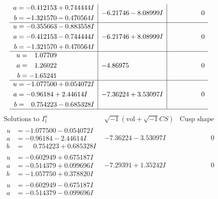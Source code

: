 \documentclass[1p]{elsarticle_modified}
\theoremstyle{definition}
\newcommand{\I}{\sqrt{-1}}
\begin{document}
$$\begin{array}{c|c|c}
\begin{aligned}
a &= -0.412153 + 0.744444 I \\
b &= -1.321570 - 0.470564 I\end{aligned}
 & -6.21746 - 8.08999 I & \phantom{-0.000000 } 0 \\ \hline\begin{aligned}
u &= -0.355663 - 0.883558 I \\
a &= -0.412153 - 0.744444 I \\
b &= -1.321570 + 0.470564 I\end{aligned}
 & -6.21746 + 8.08999 I & \phantom{-0.000000 } 0 \\ \hline\begin{aligned}
u &= \phantom{-}1.07709\phantom{ +0.000000I} \\
a &= \phantom{-}1.26022\phantom{ +0.000000I} \\
b &= -1.65241\phantom{ +0.000000I}\end{aligned}
 & -4.86975\phantom{ +0.000000I} & \phantom{-0.000000 } 0 \\ \hline\begin{aligned}
u &= -1.077500 + 0.054072 I \\
a &= -0.96184 + 2.44614 I \\
b &= \phantom{-}0.754223 - 0.685328 I\end{aligned}
 & -7.36224 + 3.53097 I & \phantom{-0.000000 } 0\\
 \hline 
 \end{array}$$\newpage$$\begin{array}{c|c|c}  
\text{Solutions to }I^u_{1}& \I (\text{vol} + \sqrt{-1}CS) & \text{Cusp shape}\\
 \hline 
\begin{aligned}
u &= -1.077500 - 0.054072 I \\
a &= -0.96184 - 2.44614 I \\
b &= \phantom{-}0.754223 + 0.685328 I\end{aligned}
 & -7.36224 - 3.53097 I & \phantom{-0.000000 } 0 \\ \hline\begin{aligned}
u &= -0.602949 + 0.675187 I \\
a &= -0.514379 + 0.099696 I \\
b &= -1.057750 + 0.378820 I\end{aligned}
 & -7.29391 + 1.35242 I & \phantom{-0.000000 } 0 \\ \hline\begin{aligned}
u &= -0.602949 - 0.675187 I \\
a &= -0.514379 - 0.099696 I \\

\end{aligned}
\end{array}$$
\end{document}
